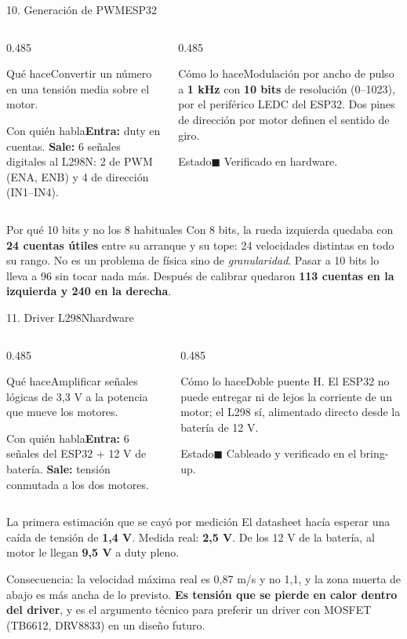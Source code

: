 \documentclass[aspectratio=169,10pt]{beamer}
\newcommand{\listo}{\textcolor{verde}{$\blacksquare$}}
\newcommand{\ficha}[4]{%
  {\footnotesize
  \begin{columns}[T,onlytextwidth]
    \begin{column}{0.485\textwidth}
      \begin{block}{Qué hace}#1\end{block}
      \begin{block}{Con quién habla}#3\end{block}
    \end{column}
    \begin{column}{0.485\textwidth}
      \begin{block}{Cómo lo hace}#2\end{block}
      \begin{block}{Estado}#4\end{block}
    \end{column}
  \end{columns}}}
\begin{document}
\begin{frame}{10. Generación de PWM\hfill{\small\mdseries ESP32}}
  \ficha
  {Convertir un número en una tensión media sobre el motor.}
  {Modulación por ancho de pulso a \textbf{1 kHz} con \textbf{10 bits} de
   resolución (0--1023), por el periférico LEDC del ESP32. Dos pines de
   dirección por motor definen el sentido de giro.}
  {\textbf{Entra:} duty en cuentas. \textbf{Sale:} 6 señales digitales al
   L298N: 2 de PWM (ENA, ENB) y 4 de dirección (IN1--IN4).}
  {\listo{} Verificado en hardware.}

  \vspace{0.4em}
  \small
  \begin{alertblock}{Por qué 10 bits y no los 8 habituales}
    Con 8 bits, la rueda izquierda quedaba con \textbf{24 cuentas útiles} entre
    su arranque y su tope: 24 velocidades distintas en todo su rango. No es un
    problema de física sino de \emph{granularidad}. Pasar a 10 bits lo lleva a
    96 sin tocar nada más. Después de calibrar quedaron \textbf{113 cuentas en la
    izquierda y 240 en la derecha}.
  \end{alertblock}
\end{frame}

\begin{frame}{11. Driver L298N\hfill{\small\mdseries hardware}}
  \ficha
  {Amplificar señales lógicas de 3,3 V a la potencia que mueve los motores.}
  {Doble puente H. El ESP32 no puede entregar ni de lejos la corriente de un
   motor; el L298 sí, alimentado directo desde la batería de 12 V.}
  {\textbf{Entra:} 6 señales del ESP32 + 12 V de batería.
   \textbf{Sale:} tensión conmutada a los dos motores.}
  {\listo{} Cableado y verificado en el bring-up.}

  \vspace{0.4em}
  \begin{alertblock}{La primera estimación que se cayó por medición}
    \small
    El datasheet hacía esperar una caída de tensión de \textbf{1,4 V}. Medida
    real: \textbf{2,5 V}. De los 12 V de la batería, al motor le llegan
    \textbf{9,5 V} a duty pleno.

    \vspace{0.3em}
    Consecuencia: la velocidad máxima real es 0,87 m/s y no 1,1, y la zona muerta
    de abajo es más ancha de lo previsto. \textbf{Es tensión que se pierde en
    calor dentro del driver}, y es el argumento técnico para preferir un driver
    con MOSFET (TB6612, DRV8833) en un diseño futuro.
  \end{alertblock}
\end{frame}
\end{document}
